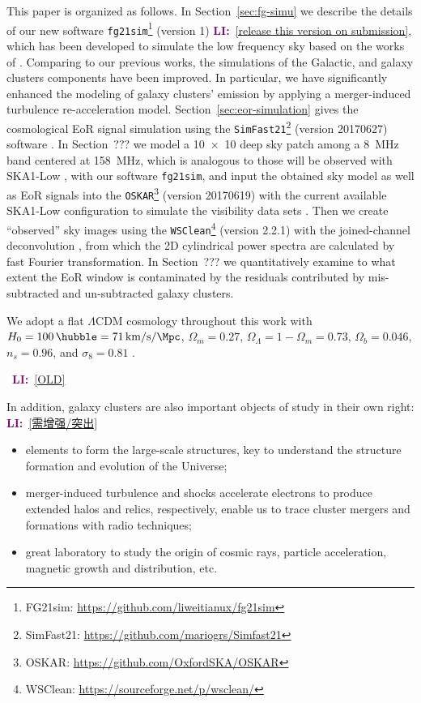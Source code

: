 \documentclass[modern]{aastex61}
\newcommand{\lcdm}{$\Lambda$CDM}
\newcommand{\LI}[1]{\textcolor{purple}{\textbf{LI:}}~\uline{#1}}
\begin{document}
This paper is organized as follows.
In Section~\ref{sec:fg-simu} we describe the details of our new software
\texttt{fg21sim}\footnote{FG21sim: \url{https://github.com/liweitianux/fg21sim}}
(version 1) \LI{[release this version on submission]},
which has been developed to simulate the low frequency sky based on the
works of \citet{wang2010,wang2013}.
Comparing to our previous works, the simulations of the Galactic,
and galaxy clusters components have been improved.
In particular, we have significantly enhanced the modeling of galaxy clusters'
emission by applying a merger-induced turbulence re-acceleration model.
Section~\ref{sec:eor-simulation} gives the cosmological EoR signal simulation
using the \texttt{SimFast21}\footnote{SimFast21:
  \url{https://github.com/mariogrs/Simfast21}} (version 20170627)
software \citep{santos2010,hassan2016}.
In Section~??? we model a \SI[product-units=power]{10 x 10}{\deg} deep sky
patch among a \SI{8}{\MHz} band centered at \SI{158}{\MHz}, which is
analogous to those will be observed with SKA1-Low
\citep[see][for updated SKA observing strategies]{koopmans2015rev},
with our software \texttt{fg21sim},
and input the obtained sky model as well as EoR signals into the
\texttt{OSKAR}\footnote{OSKAR: \url{https://github.com/OxfordSKA/OSKAR}}
(version 20170619) with the current available SKA1-Low configuration to
simulate the visibility data sets \citep{mort2010}.
Then we create ``observed'' sky images using the
\texttt{WSClean}\footnote{WSClean: \url{https://sourceforge.net/p/wsclean/}}
(version 2.2.1) with the joined-channel deconvolution
\citep{offringa2014,offringa2017}, from which the 2D cylindrical power spectra
are calculated by fast Fourier transformation.
In Section~??? we quantitatively examine to what extent the EoR window is
contaminated by the residuals contributed by mis-subtracted and un-subtracted
galaxy clusters.

We adopt a flat \lcdm{} cosmology throughout this work with
$H_0 = \SI{100}{\hubble} = \SI{71}{\km\per\second\per\Mpc}$,
$\Omega_m = 0.27$, $\Omega_{\Lambda} = 1 - \Omega_m = 0.73$,
$\Omega_b = 0.046$, $n_s = 0.96$, and $\sigma_8 = 0.81$
\citep{komatsu2011}.

\noindent\hrulefill~\LI{[OLD]}~\hrulefill

In addition, galaxy clusters are also important objects of study in their
own right:
\LI{[需增强/突出]}
\begin{itemize}
  \item elements to form the large-scale structures, key to understand the
    structure formation and evolution of the Universe;
  \item merger-induced turbulence and shocks accelerate electrons to produce
    extended halos and relics, respectively, enable us to trace cluster
    mergers and formations with radio techniques;
  \item great laboratory to study the origin of cosmic rays, particle
    acceleration, magnetic growth and distribution, etc.
\end{itemize}
\end{document}
